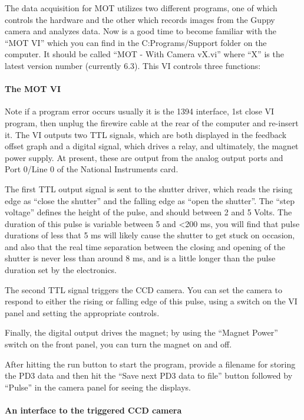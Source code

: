 \documentclass{../lab}
\begin{document}
The data acquisition for MOT utilizes two different programs, one of which controls the hardware and the other which records images from the Guppy camera and analyzes data. Now is a good time to become familiar with the ``MOT VI'' which you can find in the C:Programs/Support folder on the computer. It should be called ``MOT - With Camera vX.vi'' where ``X'' is the latest version number (currently 6.3). This VI controls three functions:

\paragraph{The MOT VI}

Note if a program error occurs usually it is the 1394 interface, 1st close VI program, then unplug the firewire cable at the rear of the computer and re-insert it. The VI outputs two TTL signals, which are both displayed in the feedback offset graph and a digital signal, which drives a relay, and ultimately, the magnet power supply. At present, these are output from the analog output ports and Port 0/Line 0 of the National Instruments card.

The first TTL output signal is sent to the shutter driver, which reads the rising edge as ``close the shutter'' and the falling edge as ``open the shutter''. The ``step voltage'' defines the height of the pulse, and should between 2 and 5 Volts. The duration of this pulse is variable between 5 and <200 ms, you will find that pulse durations of less that 5 ms will likely cause the shutter to get stuck on occasion, and also that the real time separation between the closing and opening of the shutter is never less than around 8 ms, and is a little longer than the pulse duration set by the electronics.

The second TTL signal triggers the CCD camera. You can set the camera to respond to either the rising or falling edge of this pulse, using a switch on the VI panel and setting the appropriate controls.

Finally, the digital output drives the magnet; by using the ``Magnet Power'' switch on the front panel, you can turn the magnet on and off.

After hitting the run button to start the program, provide a filename for storing the PD3 data and then hit the ``Save next PD3 data to file'' button followed by ``Pulse'' in the camera panel for seeing the displays.

\paragraph{An interface to the triggered CCD camera}
\label{par:InterfaceToTriggeredCCDCamera}
\end{document}
